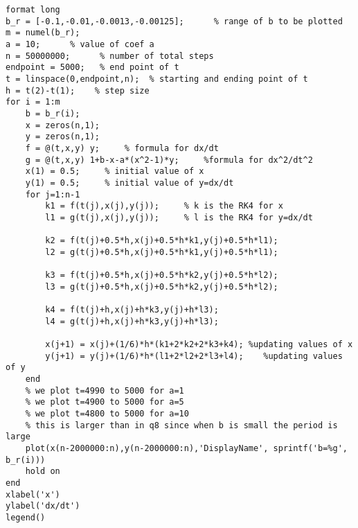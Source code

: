 \lstset{basicstyle=\footnotesize,style=myCustomMatlabStyle}
\begin{lstlisting}
format long
b_r = [-0.1,-0.01,-0.0013,-0.00125];      % range of b to be plotted
m = numel(b_r);
a = 10;      % value of coef a
n = 50000000;      % number of total steps
endpoint = 5000;   % end point of t 
t = linspace(0,endpoint,n);  % starting and ending point of t
h = t(2)-t(1);    % step size
for i = 1:m
    b = b_r(i);
    x = zeros(n,1);
    y = zeros(n,1);
    f = @(t,x,y) y;     % formula for dx/dt
    g = @(t,x,y) 1+b-x-a*(x^2-1)*y;     %formula for dx^2/dt^2
    x(1) = 0.5;     % initial value of x
    y(1) = 0.5;     % initial value of y=dx/dt
    for j=1:n-1
        k1 = f(t(j),x(j),y(j));     % k is the RK4 for x
        l1 = g(t(j),x(j),y(j));     % l is the RK4 for y=dx/dt

        k2 = f(t(j)+0.5*h,x(j)+0.5*h*k1,y(j)+0.5*h*l1);
        l2 = g(t(j)+0.5*h,x(j)+0.5*h*k1,y(j)+0.5*h*l1);

        k3 = f(t(j)+0.5*h,x(j)+0.5*h*k2,y(j)+0.5*h*l2);
        l3 = g(t(j)+0.5*h,x(j)+0.5*h*k2,y(j)+0.5*h*l2);

        k4 = f(t(j)+h,x(j)+h*k3,y(j)+h*l3);
        l4 = g(t(j)+h,x(j)+h*k3,y(j)+h*l3);

        x(j+1) = x(j)+(1/6)*h*(k1+2*k2+2*k3+k4); %updating values of x
        y(j+1) = y(j)+(1/6)*h*(l1+2*l2+2*l3+l4);    %updating values of y
    end
    % we plot t=4990 to 5000 for a=1
    % we plot t=4900 to 5000 for a=5
    % we plot t=4800 to 5000 for a=10
    % this is larger than in q8 since when b is small the period is large
    plot(x(n-2000000:n),y(n-2000000:n),'DisplayName', sprintf('b=%g', b_r(i)))
    hold on
end
xlabel('x')
ylabel('dx/dt')
legend()

\end{lstlisting}